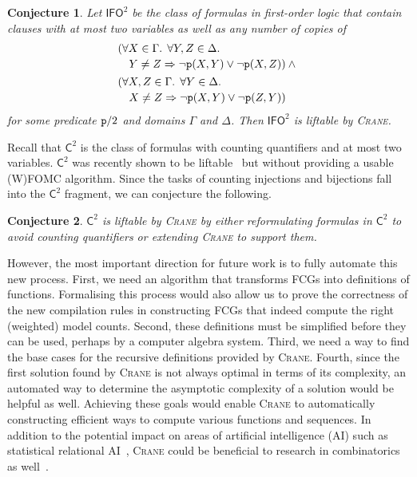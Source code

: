 \documentclass{article}
\newtheorem{conjecture}{Conjecture}
\theoremstyle{definition}
\theoremstyle{remark}
\newcommand{\Ctwo}{$\mathsf{C}^{2}$}
\newcommand{\IFO}{$\mathsf{I}\mathsf{FO}^{2}$}
\begin{document}
\begin{conjecture}
  Let \IFO{} be the class of formulas in first-order logic that contain clauses
  with at most two variables as well as any number of copies of
  \begin{align*}
    &\begin{multlined}[t]
      (\forall X \in \Gamma\text{. }\forall Y, Z \in \Delta\text{. }\\
      Y \ne Z \Rightarrow \neg \texttt{\textup{p}}(X, Y) \lor \neg \texttt{\textup{p}}(X, Z)) \land{}
    \end{multlined}\\
    &\begin{multlined}[t]
      (\forall X, Z \in \Gamma\text{. }\forall Y \in \Delta\text{. }\\
      X \ne Z \Rightarrow \neg \texttt{\textup{p}}(X, Y) \lor \neg \texttt{\textup{p}}(Z, Y))
    \end{multlined}
  \end{align*}
  for some predicate $\texttt{\textup{p}}/2$ and domains $\Gamma$ and $\Delta$.
  Then \IFO{} is liftable by \textsc{Crane}.
\end{conjecture}

Recall that \Ctwo{} is the class of formulas with counting quantifiers and at
most two variables. \Ctwo{} was recently shown to be
liftable~\cite{DBLP:journals/jair/Kuzelka21} but without providing a usable
(W)FOMC algorithm. Since the tasks of counting injections and bijections fall
into the \Ctwo{} fragment, we can conjecture the following.

\begin{conjecture}
  \Ctwo{} is liftable by \textsc{Crane} by either reformulating formulas in
  \Ctwo{} to avoid counting quantifiers or extending \textsc{Crane} to support
  them.
\end{conjecture}

However, the most important direction for future work is to fully automate this
new process. First, we need an algorithm that transforms FCGs into definitions
of functions. Formalising this process would also allow us to prove the
correctness of the new compilation rules in constructing FCGs that indeed
compute the right (weighted) model counts. Second, these definitions must be
simplified before they can be used, perhaps by a computer algebra system. Third,
we need a way to find the base cases for the recursive definitions provided by
\textsc{Crane}. Fourth, since the first solution found by \textsc{Crane} is not
always optimal in terms of its complexity, an automated way to determine the
asymptotic complexity of a solution would be helpful as well. Achieving these
goals would enable \textsc{Crane} to automatically constructing efficient ways
to compute various functions and sequences. In addition to the potential impact
on areas of artificial intelligence (AI) such as statistical relational
AI~\cite{DBLP:series/synthesis/2016Raedt}, \textsc{Crane} could be beneficial to
research in combinatorics as
well~\cite{DBLP:conf/ilp/BarvinekB0ZK21,DBLP:journals/corr/abs-2302-04606}.




\end{document}
